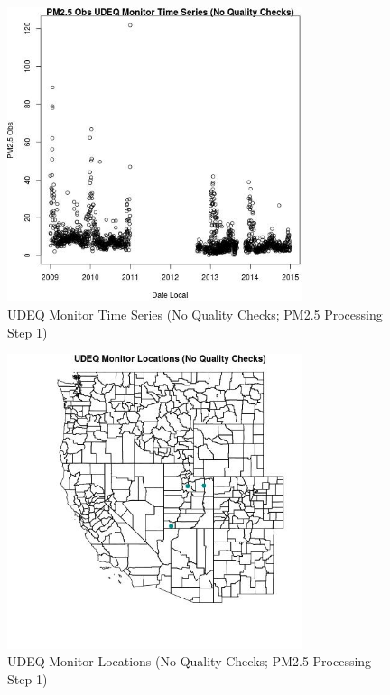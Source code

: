 
\begin{figure} 
\centering  
\includegraphics[width=0.77\textwidth]{Code_Outputs/PM25Source9TSstep1_PM25_ObsvDate_Local.jpg} 
\caption{\label{fig:PM25Source9TSstep1PM25_ObsvDate_Local}UDEQ Monitor Time Series (No Quality Checks; PM2.5 Processing Step 1)} 
\end{figure} 
 

\begin{figure} 
\centering  
\includegraphics[width=0.77\textwidth]{Code_Outputs/PM25Source9TSstep1_MapUDEQLocations.jpg} 
\caption{\label{fig:PM25Source9TSstep1MapUDEQLocations}UDEQ Monitor Locations (No Quality Checks; PM2.5 Processing Step 1)} 
\end{figure} 
 
